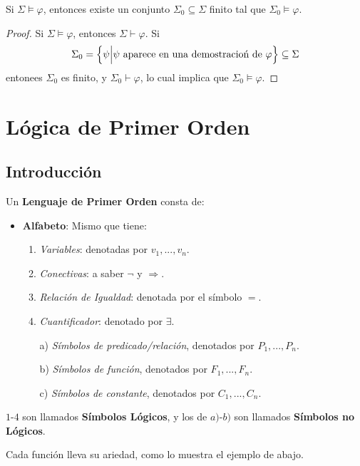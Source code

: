 \documentclass[12pt]{report}
\theoremstyle{largebreak}
\begin{document}
    \begin{cor}
        Si $\Sigma\vDash\varphi$, entonces existe un conjunto $\Sigma_0\subseteq\Sigma$ finito tal que $\Sigma_0\vDash\varphi$.
    \end{cor}

    \begin{proof}
        Si $\Sigma\vDash\varphi$, entonces $\Sigma\vdash\varphi$. Si
        \begin{equation*}
            \Sigma_0=\left\{\psi\Big|\psi\textup{ aparece en una demostracioń de }\varphi \right\}\subseteq\Sigma
        \end{equation*}
        entonees $\Sigma_0$ es finito, y $\Sigma_0\vdash\varphi$, lo cual implica que $\Sigma_0\vDash\varphi$.
    \end{proof}

    \chapter{Lógica de Primer Orden}

    \section{Introducción}

    \begin{mydef}
        Un \textbf{Lenguaje de Primer Orden} consta de:
        \begin{itemize}
            \item \textbf{Alfabeto}: Mismo que tiene:
            \begin{enumerate}
                \item \textit{Variables}: denotadas por $v_1,...,v_n$.
                \item \textit{Conectivas}: a saber $\neg$ y $\Rightarrow$.
                \item \textit{Relación de Igualdad}: denotada por el símbolo $=$.
                \item \textit{Cuantificador}: denotado por $\exists$.
                \item[a)] \textit{Símbolos de predicado/relación}, denotados por $P_1,...,P_n$.
                \item[b)] \textit{Símbolos de función}, denotados por $F_1,...,F_n$.
                \item[c)] \textit{Símbolos de constante}, denotados por $C_1,...,C_n$.
            \end{enumerate}
        \end{itemize}
        $1$-$4$ son llamados \textbf{Símbolos Lógicos}, y los de $a)$-$b)$ son llamados \textbf{Símbolos no Lógicos}.

        Cada función lleva su ariedad, como lo muestra el ejemplo de abajo.
    \end{mydef}
\end{document}
